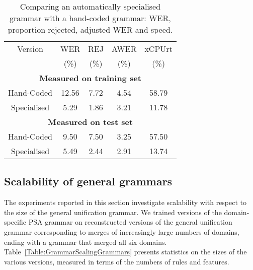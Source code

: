 \documentclass[11pt]{article}
\begin{document}
\begin{table}[h]
\begin{tabular}{|c||c|c|c|c|}
\hline
Version 	&WER	&REJ	&AWER	&xCPUrt	\\
		&(\%)	&(\%)	&(\%)	&(\%)	\\
\hline	
\hline	
\multicolumn{5}{|c|}{\bf Measured on training set}\\
\hline
Hand-Coded	&12.56 	&7.72 	&4.54 	&58.79 	\\
\hline						
Specialised	&5.29	&1.86  	&3.21  	&11.78	\\
\hline						
\multicolumn{5}{|c|}{\bf Measured on test set}\\
\hline
Hand-Coded	&9.50	&7.50	&3.25 	&57.50	\\
\hline						
Specialised	&5.49 	&2.44 	&2.91 	&13.74	\\
\hline						
\hline						
\end{tabular}
\caption{Comparing an automatically specialised grammar with a hand-coded grammar:
WER, proportion rejected, adjusted WER and speed.}
\label{Table:HandCodedVsSpecialised}
\end{table}


\subsection{Scalability of general grammars}
\label{Section:GrammarScalability}

The experiments reported in this section investigate scalability with
respect to the size of the general unification grammar. We trained
versions of the domain-specific PSA grammar on reconstructed versions
of the general unification grammar corresponding to merges of
increasingly large numbers of domains, ending with a grammar that
merged all six domains. Table~\ref{Table:GrammarScalingGrammars}
presents statistics on the sizes of the various versions, measured in
terms of the numbers of rules and features.
\end{document}
